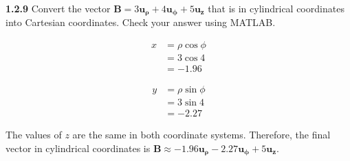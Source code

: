 \documentclass{article}
\begin{document}
\textbf{1.2.9} Convert the vector $\mathbf{B} = 3\mathbf{u_\rho} + 4\mathbf{u_\phi} + 5\mathbf{u_z}$ that is in
cylindrical coordinates into Cartesian coordinates. Check your answer using MATLAB.\@

\begin{equation*}
	\begin{split}
		x & = \rho \cos{\phi} \\
		& = 3 \cos{4} \\
		& = -1.96
	\end{split}
\end{equation*}

\begin{equation*}
	\begin{split}
		y & = \rho \sin{\phi} \\
		& = 3 \sin{4} \\
		& = -2.27
	\end{split}
\end{equation*}

The values of $z$ are the same in both coordinate systems. Therefore, the final vector in cylindrical coordinates is
$\mathbf{B} \approx -1.96\mathbf{u_\rho} - 2.27\mathbf{u_\phi} + 5\mathbf{u_z}$.
\end{document}

